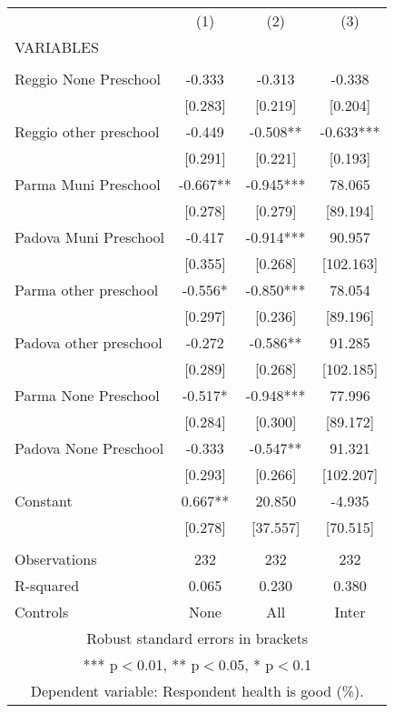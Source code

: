\begin{tabular}{lccc} \hline
 & (1) & (2) & (3) \\
VARIABLES &  &  &  \\ \hline
 &  &  &  \\
Reggio None Preschool & -0.333 & -0.313 & -0.338 \\
 & [0.283] & [0.219] & [0.204] \\
Reggio other preschool & -0.449 & -0.508** & -0.633*** \\
 & [0.291] & [0.221] & [0.193] \\
Parma Muni Preschool & -0.667** & -0.945*** & 78.065 \\
 & [0.278] & [0.279] & [89.194] \\
Padova Muni Preschool & -0.417 & -0.914*** & 90.957 \\
 & [0.355] & [0.268] & [102.163] \\
Parma other preschool & -0.556* & -0.850*** & 78.054 \\
 & [0.297] & [0.236] & [89.196] \\
Padova other preschool & -0.272 & -0.586** & 91.285 \\
 & [0.289] & [0.268] & [102.185] \\
Parma None Preschool & -0.517* & -0.948*** & 77.996 \\
 & [0.284] & [0.300] & [89.172] \\
Padova None Preschool & -0.333 & -0.547** & 91.321 \\
 & [0.293] & [0.266] & [102.207] \\
Constant & 0.667** & 20.850 & -4.935 \\
 & [0.278] & [37.557] & [70.515] \\
 &  &  &  \\
Observations & 232 & 232 & 232 \\
R-squared & 0.065 & 0.230 & 0.380 \\
 Controls & None & All & Inter \\ \hline
\multicolumn{4}{c}{ Robust standard errors in brackets} \\
\multicolumn{4}{c}{ *** p$<$0.01, ** p$<$0.05, * p$<$0.1} \\
\multicolumn{4}{c}{ Dependent variable: Respondent health is good (\%).} \\
\end{tabular}
